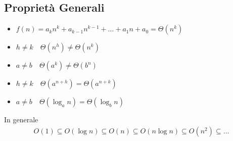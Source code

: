 \subsection{Proprietà Generali}
\begin{itemize}
	\item $f(n) = a_kn^k + a_{k-1}n^{k-1} + \dots + a_1n + a_0 = \Theta (n^k)$
	\item $h \neq k \quad \Theta (n^h) \neq \Theta (n^k)$
	\item $a \neq b \quad \Theta (a^k) \neq \Theta (b^n)$
	\item $h \neq k \quad \Theta (a^{n+h}) = \Theta (a^{n+k})$
	\item $a \neq b \quad \Theta (\log_an) = \Theta (\log_bn)$
\end{itemize} 
In generale
\begin{gather*}
	O(1) \subseteq O(\log n) \subseteq O(n) \subseteq O(n \log n) \subseteq O(n^2) \subseteq \dots
\end{gather*}